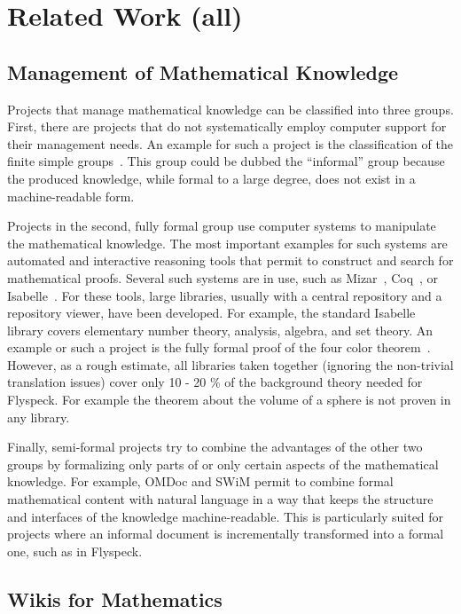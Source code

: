 \section{Related Work (all)}
\label{sec:related}


\subsection{Management of Mathematical Knowledge}
\label{sec:mkm}

Projects that manage mathematical knowledge can be classified into three groups.  First, there are projects that do not systematically employ computer support for their management needs.  An example for such a project is the classification of the finite simple groups~\cite{Gorenstein-Lyons-Salomon:1994}.  This group could be dubbed the ``informal'' group because the produced knowledge, while formal to a large degree, does not exist in a machine-readable form.

Projects in the second, fully formal group use computer systems to manipulate the mathematical knowledge.  The most important examples for such systems are automated and interactive reasoning tools that permit to construct and search for mathematical proofs. Several such systems are in use, such as Mizar~\cite{mizarmanual}, Coq~\cite{Coq}, or Isabelle~\cite{Isabelle}.  For these tools, large libraries, usually with a central repository and a repository viewer, have been developed.  For example, the standard Isabelle library covers elementary number theory, analysis, algebra, and set theory. An example or such a project is the fully formal proof of the four color theorem~\cite{Gonthier:FourColor}. However, as a rough estimate, all libraries taken together (ignoring the non-trivial translation issues) cover only 10 - 20 \% of the background theory needed for Flyspeck. For example the theorem about the volume of a sphere is not proven in any library.

Finally, semi-formal projects try to combine the advantages of the other two groups by formalizing only parts of or only certain aspects of the mathematical knowledge.  For example, OMDoc and SWiM permit to combine formal mathematical content with natural language in a way that keeps the structure and interfaces of the knowledge machine-readable.  This is particularly suited for projects where an informal document is incrementally transformed into a formal one, such as in Flyspeck.

\subsection{Wikis for Mathematics}
\label{sec:math-wiki}

